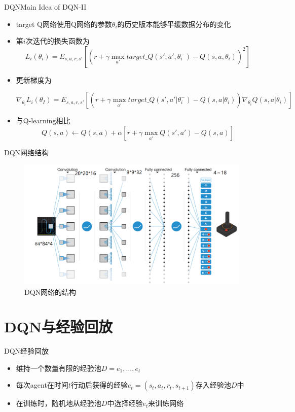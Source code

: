 \documentclass[10pt]{beamer}
\begin{document}
	\begin{frame}{DQN}{Main Idea of DQN-II}
		\begin{itemize}
			\item target Q网络使用Q网络的参数$\theta_i$的历史版本能够平缓数据分布的变化
			
			\item 第$i$次迭代的损失函数为
			\[L_i(\theta_i)=E_{s,a,r,s'}[(r + \gamma \max_{a'}target\_Q(s',a',\theta_i^-) - Q(s,a,\theta_i))^2] \]
			
			\item 更新梯度为
				\begin{small}
					\[\nabla_{\theta_i}L_i(\theta_I) = E_{s,a,r,s'}[(r + \gamma \max_{a'} target\_Q(s',a'|\theta_i^-) - Q(s,a|\theta_i))\nabla_{\theta_i}Q(s,a|\theta_i)] \]
				\end{small}
			
			\item 与Q-learning相比
			\[ Q(s, a) \gets Q(s, a) + \alpha \left[r + \gamma \max_{a'}Q(s', a') - Q(s, a) \right] \]
			
		\end{itemize}
	\end{frame}

	\begin{frame}{DQN}{网络结构}
		\begin{figure}
			\centering
			\includegraphics[width=0.8\linewidth]{pictures/dqn-architecture}
			\caption{DQN网络的结构}
			\label{fig:dqn-architecture}
		\end{figure}
		
	\end{frame}

	\section{DQN与经验回放}

	\begin{frame}{DQN}{经验回放}
		\begin{itemize}
			\item 维持一个数量有限的经验池$D=e_1,\dots,e_t$
			
			\item 每次agent在时间$t$行动后获得的经验$e_t = (s_t,a_t,r_t,s_{t+1})$存入经验池$D$中
			
			\item 在训练时，随机地从经验池$D$中选择经验$e_t$来训练网络
			
		\end{itemize}
	\end{frame}
	
\end{document}
